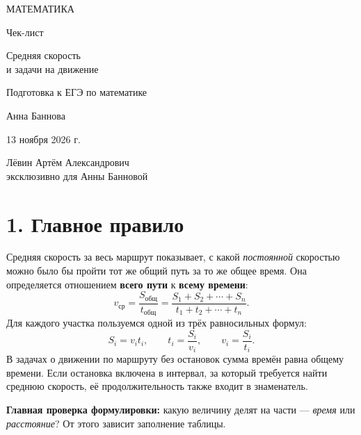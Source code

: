 \documentclass[a4paper,12pt]{article}
\newcommand{\key}[1]{\textcolor{darkaccent}{\textbf{#1}}}
\begin{document}
\thispagestyle{empty}
\begin{center}
\vspace*{25mm}
{\Large\color{darkaccent} МАТЕМАТИКА}\par
\vspace{22mm}
{\fontsize{29}{34}\selectfont\color{ink} Чек-лист}\par
\vspace{12mm}
{\fontsize{22}{28}\selectfont\color{accent} Средняя скорость\\[3pt] и задачи на движение}\par
\vspace{19mm}
{\large Подготовка к ЕГЭ по математике}\par
\vfill
{\Large Анна Баннова}\par
\vspace{11mm}
{\large 13 ноября 2026 г.}\par
\vspace{18mm}
{\normalsize Лёвин Артём Александрович\\эксклюзивно для Анны Банновой}\par
\vspace{14mm}
\end{center}
\clearpage

\section*{1. Главное правило}
Средняя скорость за весь маршрут показывает, с какой \emph{постоянной} скоростью можно было бы пройти тот же общий путь за то же общее время. Она определяется отношением \key{всего пути} к \key{всему времени}:
\[
\boxed{\displaystyle v_{\text{ср}}=\frac{S_{\text{общ}}}{t_{\text{общ}}}=\frac{S_1+S_2+\cdots+S_n}{t_1+t_2+\cdots+t_n}.}
\]
Для каждого участка пользуемся одной из трёх равносильных формул:
\[
S_i=v_it_i,\qquad t_i=\frac{S_i}{v_i},\qquad v_i=\frac{S_i}{t_i}.
\]
В задачах о движении по маршруту без остановок сумма времён равна общему времени. Если остановка включена в интервал, за который требуется найти среднюю скорость, её продолжительность также входит в знаменатель.

\key{Главная проверка формулировки:} какую величину делят на части --- \emph{время} или \emph{расстояние}? От этого зависит заполнение таблицы.
\end{document}
